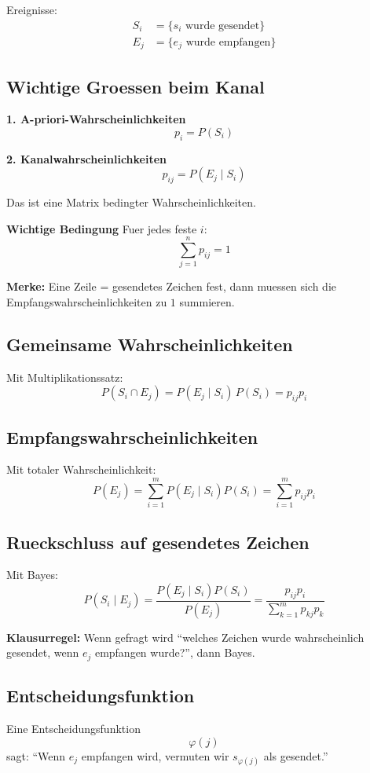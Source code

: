 \documentclass[a4paper,11pt]{article}
\begin{document}
Ereignisse:
\begin{align*}
S_i &= \{\text{$s_i$ wurde gesendet}\} \\
E_j &= \{\text{$e_j$ wurde empfangen}\}
\end{align*}

\subsection{Wichtige Groessen beim Kanal}
\textbf{1. A-priori-Wahrscheinlichkeiten}
\[
p_i=P(S_i)
\]

\textbf{2. Kanalwahrscheinlichkeiten}
\[
p_{ij}=P(E_j\mid S_i)
\]

Das ist eine Matrix bedingter Wahrscheinlichkeiten.

\textbf{Wichtige Bedingung}
Fuer jedes feste $i$:
\[
\sum_{j=1}^n p_{ij}=1
\]

\textbf{Merke:}
Eine Zeile = gesendetes Zeichen fest, dann muessen sich die Empfangswahrscheinlichkeiten zu $1$ summieren.

\subsection{Gemeinsame Wahrscheinlichkeiten}
Mit Multiplikationssatz:
\[
P(S_i \cap E_j)=P(E_j\mid S_i)\,P(S_i)=p_{ij}p_i
\]

\subsection{Empfangswahrscheinlichkeiten}
Mit totaler Wahrscheinlichkeit:
\[
P(E_j)=\sum_{i=1}^m P(E_j\mid S_i)P(S_i)=\sum_{i=1}^m p_{ij}p_i
\]

\subsection{Rueckschluss auf gesendetes Zeichen}
Mit Bayes:
\[
P(S_i\mid E_j)=\frac{P(E_j\mid S_i)P(S_i)}{P(E_j)}
=\frac{p_{ij}p_i}{\sum_{k=1}^m p_{kj}p_k}
\]

\textbf{Klausurregel:}
Wenn gefragt wird ``welches Zeichen wurde wahrscheinlich gesendet, wenn $e_j$ empfangen wurde?'', dann Bayes.

\subsection{Entscheidungsfunktion}
Eine Entscheidungsfunktion
\[
\varphi(j)
\]
sagt:
``Wenn $e_j$ empfangen wird, vermuten wir $s_{\varphi(j)}$ als gesendet.''
\end{document}
